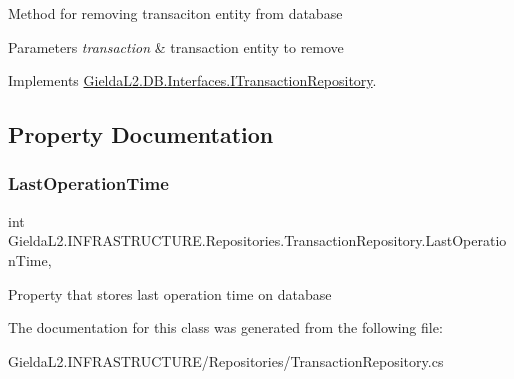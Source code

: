 Method for removing transaciton entity from database 


\begin{DoxyParams}{Parameters}
{\em transaction} & transaction entity to remove\\
\hline
\end{DoxyParams}


Implements \mbox{\hyperlink{interface_gielda_l2_1_1_d_b_1_1_interfaces_1_1_i_transaction_repository_a6bd6442beda16c8af22a14457f1c6cc5}{Gielda\+L2.\+D\+B.\+Interfaces.\+I\+Transaction\+Repository}}.



\subsection{Property Documentation}
\mbox{\label{class_gielda_l2_1_1_i_n_f_r_a_s_t_r_u_c_t_u_r_e_1_1_repositories_1_1_transaction_repository_aac4f791168cb10869951f5f883895ad3}} 
\subsubsection{\texorpdfstring{LastOperationTime}{LastOperationTime}}
{\footnotesize\ttfamily int Gielda\+L2.\+I\+N\+F\+R\+A\+S\+T\+R\+U\+C\+T\+U\+R\+E.\+Repositories.\+Transaction\+Repository.\+Last\+Operation\+Time\hspace{0.3cm}{\ttfamily [get]}, {\ttfamily [set]}}



Property that stores last operation time on database 



The documentation for this class was generated from the following file\+:\begin{DoxyCompactItemize}
\item 
Gielda\+L2.\+I\+N\+F\+R\+A\+S\+T\+R\+U\+C\+T\+U\+R\+E/\+Repositories/Transaction\+Repository.\+cs\end{DoxyCompactItemize}
